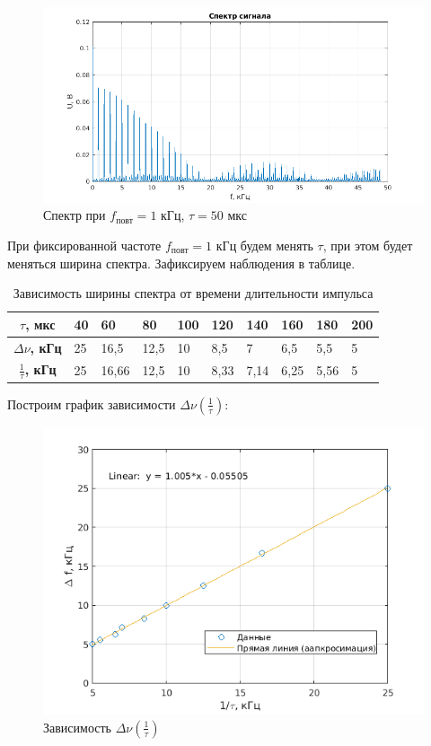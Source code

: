 \documentclass[a4paper, 12pt]{article}%
\begin{document}
\begin{figure}[h!]
    \centering
    \includegraphics[width = 14 cm]{images/1_50_1.png}
    \caption{Спектр при $f_{\text{повт}} = 1$ кГц, $\tau = 50$ мкс}
\end{figure}

При фиксированной частоте $f_{\text{повт}} = 1$ кГц будем менять $\tau$, при этом будет меняться ширина спектра. Зафиксируем наблюдения в таблице.

\begin{table}[]
    \centering
    \begin{tabular}{|c|l|l|l|l|l|l|l|l|l|}
        \hline
        \textbf{$\tau$, мкс}           & 40 & 60    & 80   & 100 & 120  & 140  & 160  & 180  & 200 \\ \hline
        \textbf{$\Delta \nu$, кГц}     & 25 & 16,5  & 12,5 & 10  & 8,5  & 7    & 6,5  & 5,5  & 5   \\ \hline
        \textbf{$\frac{1}{\tau}$, кГц} & 25 & 16,66 & 12,5 & 10  & 8,33 & 7,14 & 6,25 & 5,56 & 5   \\ \hline
    \end{tabular}
    \caption{Зависимость ширины спектра от времени длительности импульса}
\end{table}

Построим график зависимости $\Delta \nu (\frac{1}{\tau})$:

\begin{figure}[h!]
    \centering
    \includegraphics[width = 13 cm]{images/1_appr.png}
    \caption{Зависимость $\Delta \nu (\frac{1}{\tau})$}
\end{figure}
\end{document}
